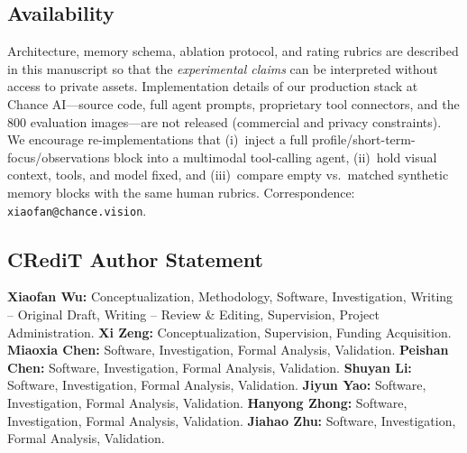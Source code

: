 \documentclass[11pt,a4paper]{article}
\begin{document}
\subsection*{Availability}
Architecture, memory schema, ablation protocol, and rating rubrics are described in this manuscript so that the \emph{experimental claims} can be interpreted without access to private assets. Implementation details of our production stack at Chance AI---source code, full agent prompts, proprietary tool connectors, and the 800 evaluation images---are not released (commercial and privacy constraints). We encourage re-implementations that (i)~inject a full profile/short-term-focus/observations block into a multimodal tool-calling agent, (ii)~hold visual context, tools, and model fixed, and (iii)~compare empty vs.\ matched synthetic memory blocks with the same human rubrics. Correspondence: \texttt{xiaofan@chance.vision}.

\subsection*{CRediT Author Statement}
\textbf{Xiaofan Wu:} Conceptualization, Methodology, Software, Investigation, Writing -- Original Draft, Writing -- Review \& Editing, Supervision, Project Administration.
\textbf{Xi Zeng:} Conceptualization, Supervision, Funding Acquisition.
\textbf{Miaoxia Chen:} Software, Investigation, Formal Analysis, Validation.
\textbf{Peishan Chen:} Software, Investigation, Formal Analysis, Validation.
\textbf{Shuyan Li:} Software, Investigation, Formal Analysis, Validation.
\textbf{Jiyun Yao:} Software, Investigation, Formal Analysis, Validation.
\textbf{Hanyong Zhong:} Software, Investigation, Formal Analysis, Validation.
\textbf{Jiahao Zhu:} Software, Investigation, Formal Analysis, Validation.
\end{document}
